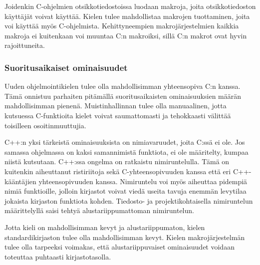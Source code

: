 Joidenkin C-ohjelmien otsikkotiedostoissa luodaan makroja, joita
otsikkotiedoston käyttäjät voivat käyttää. Kielen tulee mahdollistaa makrojen
tuottaminen, joita voi käyttää myös C-ohjelmista. Kehittyneempien
makrojärjestelmien kaikkia makroja ei kuitenkaan voi muuntaa C:n makroiksi,
sillä C:n makrot ovat hyvin rajoittuneita.

\subsubsection{Suoritusaikaiset ominaisuudet}

Uuden ohjelmointikielen tulee olla mahdollisimman yhteensopiva C:n kanssa. Tämä
onnistuu parhaiten pitämällä suoritusaikaisten ominaisuuksien määrän mahdollisimman
pienenä. Muistinhallinnan tulee olla manuaalinen, jotta kutsuessa C-funktioita
kielet voivat saumattomasti ja tehokkaasti välittää toisilleen
osoitinmuuttujia.


C++:n yksi tärkeistä ominaisuuksista on nimiavaruudet, joita C:ssä ei ole. Jos
samassa ohjelmassa on kaksi samannimistä funktiota, ei ole määritelty, kumpaa
niistä kutsutaan. C++:ssa ongelma on ratkaistu nimiruntelulla. Tämä on
kuitenkin aiheuttanut ristiriitoja sekä C-yhteensopivuuden kanssa että eri
C++-kääntäjien yhteensopivuuden kanssa. Nimiruntelu voi myös aiheuttaa pidempiä
nimiä funktioille, jolloin kirjastot voivat viedä useita tavuja enemmän
levytilaa jokaista kirjaston funktiota kohden. Tiedosto- ja projektikohtaisella
nimiruntelun määrittelyllä saisi tehtyä alustariippumattoman nimiruntelun.

Jotta kieli on mahdollisimman kevyt ja alustariippumaton, kielen
standardikirjaston tulee olla mahdollisimman kevyt. Kielen makrojärjestelmän
tulee olla tarpeeksi voimakas, että alustariippuvaiset ominaisuudet voidaan
toteuttaa puhtaasti kirjastotasolla.

